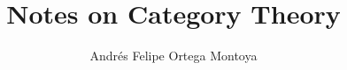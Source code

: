 \documentclass[a4paper, draft]{article}
\title{Notes on Category Theory}
\author{Andrés Felipe Ortega Montoya}
\date{}
\begin{document}
\maketitle
\tableofcontents

\newpage


\newpage


\printindex
\printbibliography
\listoftodos
\end{document}
